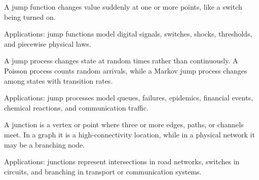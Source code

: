 A jump function changes value suddenly at one or more points, like a switch being turned on. \par\noindent Applications: jump functions model digital signals, switches, shocks, thresholds, and piecewise physical laws.

A jump process changes state at random times rather than continuously. A Poisson process counts random arrivals, while a Markov jump process changes among states with transition rates. \par\noindent Applications: jump processes model queues, failures, epidemics, financial events, chemical reactions, and communication traffic.

A junction is a vertex or point where three or more edges, paths, or channels meet. In a graph it is a high-connectivity location, while in a physical network it may be a branching node. \par\noindent Applications: junctions represent intersections in road networks, switches in circuits, and branching in transport or communication systems.
